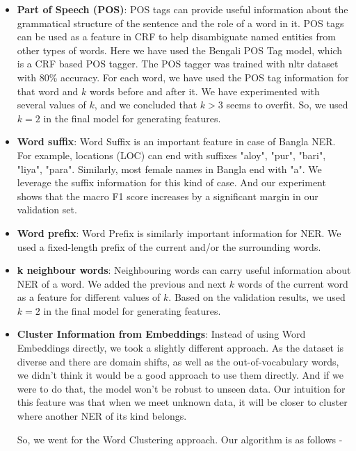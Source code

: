 \documentclass{article}
\begin{document}
\begin{itemize}
\item \textbf{Part of Speech (POS)}: POS tags can provide useful information about the grammatical structure of the sentence and the role of a word in it. POS tags can be used as a feature in CRF to help disambiguate named entities from other types of words. Here we have used the Bengali POS Tag model, which is a CRF based POS tagger. The POS tagger was trained with nltr dataset with 80\% accuracy. For each word, we have used the POS tag information for that word and $k$ words before and after it. We have experimented with several values of $k$, and we concluded that $k>3$ seems to overfit. So, we used $k = 2$ in the final model for generating features.

\item \textbf{Word suffix}: Word Suffix is an important feature in case of Bangla NER. For example, locations (LOC) can end with suffixes "aloy", "pur", "bari", "liya", "para". Similarly, most female names in Bangla end with "a". We leverage the suffix information for this kind of case. And our experiment shows that the macro F1 score increases by a significant margin in our validation set.

\item \textbf{Word prefix}: Word Prefix is similarly important information for NER. We used a fixed-length prefix of the current and/or the surrounding words.

\item \textbf{k neighbour words}: Neighbouring words can carry useful information about NER of a word. 
We added the previous and next $k$ words of the current word as a feature for different values of $k$. Based on the validation results, we used $k = 2$ in the final model for generating features.

\item \textbf{Cluster Information from Embeddings}: Instead of using Word Embeddings directly, we took a slightly different approach. As the dataset is diverse and there are domain shifts, as well as the out-of-vocabulary words, we didn't think it would be a good approach to use them directly. And if we were to do that, the model won't be robust to unseen data. Our intuition for this feature was that when we meet unknown data, it will be closer to cluster where another NER of its kind belongs.

So, we went for the Word Clustering \cite{mishra2016semi} approach. Our algorithm is as follows - 


\end{itemize}
\end{document}
